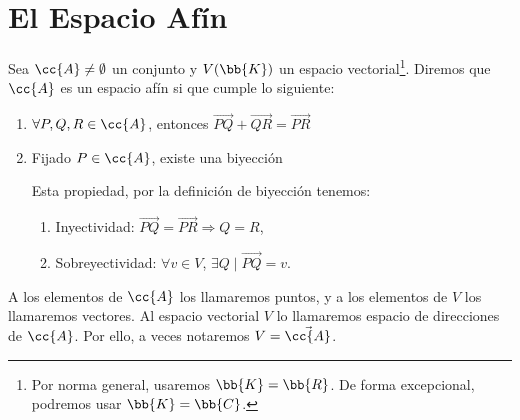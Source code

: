 \chapter{El Espacio Afín}

\begin{definicion}
    Sea $\cc{A}\neq \emptyset$ un conjunto y $V(\bb{K})$ un espacio vectorial\footnote{Por norma general, usaremos $\bb{K}=\bb{R}$. De forma excepcional, podremos usar $\bb{K}=\bb{C}$.}. Diremos que $\cc{A}$ es un espacio afín si
    que cumple lo siguiente:
    \begin{enumerate}
        \item $\forall P,Q,R\in \cc{A}$, entonces $\vec{PQ}+\vec{QR}=\vec{PR}$

        \item Fijado $P\in \cc{A}$, existe una biyección

        Esta propiedad, por la definición de biyección tenemos:
        \begin{enumerate}
            \item Inyectividad: $\vec{PQ}=\vec{PR}\Longrightarrow Q=R$,
            \item Sobreyectividad: $\forall v\in V$, $\exists Q\mid \vec{PQ}=v$.
        \end{enumerate}
    \end{enumerate}

    A los elementos de $\cc{A}$ los llamaremos puntos, y a los elementos de $V$ los llamaremos vectores. Al espacio vectorial $V$ lo llamaremos espacio de direcciones de $\cc{A}$. Por ello, a veces notaremos $V=\vec{\cc{A}}$.
\end{definicion}

